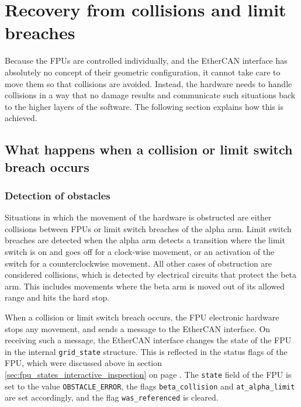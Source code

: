 \documentclass[fontsize=12,a4paper]{scrreprt}
\begin{document}
\chapter{Recovery from collisions and limit breaches}
\label{sec:recovery}

\minitoc

Because the FPUs are controlled individually, and the  EtherCAN interface
has absolutely no concept of their geometric configuration, it cannot
take care to move them so that collisions are avoided.  Instead, the
hardware needs to handle collisions in a way that no damage results
and communicate such situations back to the higher layers of the
software. The following section explains how this is achieved.

\section{What happens when a collision or limit switch breach occurs}
\subsection{Detection of obstacles}

Situations in which the movement of the hardware is obstructed are
either collisions between FPUs or limit switch breaches of the alpha
arm. Limit switch breaches are detected when the alpha arm detects a
transition where the limit switch is on and goes off for a clock-wise
movement, or an activation of the switch for a counterclockwise
movement. All other cases of obstruction are considered collisions,
which is detected by electrical circuits that protect the beta
arm. This includes movements where the beta arm is moved out of its
allowed range and hits the hard stop.

When a collision or limit switch breach occurs, the FPU electronic
hardware stops any movement, and sends a message to the EtherCAN interface. On
receiving such a message, the EtherCAN interface changes the state of the FPU in
the internal \texttt{grid\_state} structure. This is reflected in the
status flags of the FPU, which were discussed above in section
\ref{sec:fpu_states_interactive_inspection} on page \pageref{sec:fpu_states_interactive_inspection}.  The \texttt{state}
field of the FPU is set to the value \texttt{OBSTACLE\_ERROR}, the
flags \texttt{beta\_collision} and \texttt{at\_alpha\_limit} are set
accordingly, and the flag \texttt{was\_referenced} is cleared.
\end{document}
